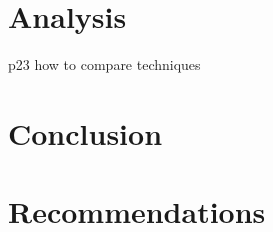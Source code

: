 \documentclass[12pt,a4paper]{article}
\begin{document}
\section{Analysis}


\cite{Murphy} p23 how to compare techniques
\section{Conclusion}

\section{Recommendations}



\appendix
\appendixpage
\end{document}
